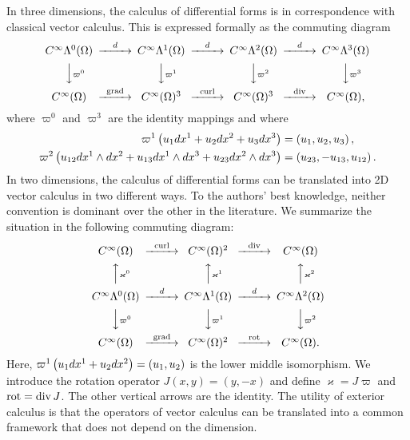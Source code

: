 \documentclass[10pt,a4paper]{article}
\begin{document}
\begin{remark}
    In three dimensions, 
    the calculus of differential forms is in correspondence with classical vector calculus. 
    This is expressed formally as the commuting diagram 
    \begin{gather*}
    \begin{CD}
        C^\infty\Alt^0(\Omega) @>{\cartan}>> C^\infty\Alt^1(\Omega) @>{\cartan}>> C^\infty\Alt^2(\Omega) @>{\cartan}>> C^\infty\Alt^3(\Omega) 
        \\
        @VV{\varpi^{0}}V 
        @VV{\varpi^{1}}V 
        @VV{\varpi^{2}}V 
        @VV{\varpi^{3}}V 
        \\
        C^\infty(\Omega) @>{\grad}>> C^\infty(\Omega)^{3} @>{\curl}>> C^\infty(\Omega)^{3} @>{\divergence}>> C^\infty(\Omega),
    \end{CD}
    \end{gather*}
    where $\varpi^{0}$ and $\varpi^{3}$ are the identity mappings and where 
    \begin{align*}
     \varpi^{1}\left( u_1 dx^{1} + u_2 dx^{2} + u_3 dx^{3} \right) 
     &= 
     \left( u_1, u_2, u_3 \right), 
     \\
     \varpi^{2}\left( u_{12} dx^{1} \wedge dx^{2} + u_{13} dx^{1} \wedge dx^{3} + u_{23} dx^{2} \wedge dx^{3} \right) 
     &= 
     \left( u_{23}, - u_{13}, u_{12} \right).   
    \end{align*}
    In two dimensions, 
    the calculus of differential forms can be translated into 2D vector calculus in two different ways. 
    To the authors' best knowledge, neither convention is dominant over the other in the literature.
    We summarize the situation in the following commuting diagram: 
    \begin{gather*} 
    \begin{CD}
        C^\infty(\Omega) @>{\curl}>> C^\infty(\Omega)^{2} @>{\divergence}>> C^\infty(\Omega)
        \\
        @AA{\varkappa^{0}}A 
        @AA{\varkappa^{1}}A 
        @AA{\varkappa^{2}}A 
        \\
        C^\infty\Alt^0(\Omega) @>{\cartan}>> C^\infty\Alt^1(\Omega) @>{\cartan}>> C^\infty\Alt^2(\Omega) 
        \\
        @VV{\varpi^{0}}V 
        @VV{\varpi^{1}}V 
        @VV{\varpi^{2}}V 
        \\
        C^\infty(\Omega) @>{\grad}>> C^\infty(\Omega)^{2} @>{\rot}>> C^\infty(\Omega)
        .
    \end{CD}
    \end{gather*}
    Here, $\varpi^{1}\left( u_1 dx^{1} + u_2 dx^{2} \right) = \left( u_1, u_2 \right)$ is the lower middle isomorphism. We introduce the rotation operator $J(x,y) = (y,-x)$ and define $\varkappa = J \varpi$ and $\operatorname{rot} = \operatorname{div} J$.
    The other vertical arrows are the identity. 
    The utility of exterior calculus is that the operators of vector calculus can be translated into a common framework that does not depend on the dimension.
\end{remark}
\end{document}
